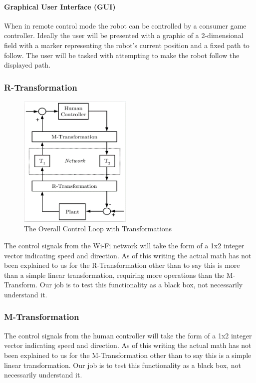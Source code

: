 \documentclass[english,12pt]{article}
\begin{document}
\paragraph{Graphical User Interface (GUI)}
When in remote control mode the robot can be controlled by a consumer game controller. Ideally the
user will be presented with a graphic of a 2-dimensional field with a marker representing the robot’s 
current position and a fixed path to follow. The user will be tasked with attempting to make the robot
follow the displayed path.
\subsubsection{R-Transformation}
\begin{figure}
    \vspace{-20pt}
    \begin{center}
      \includegraphics[width=0.48\textwidth]{ovr_tran.jpg}
    \end{center}
    \vspace{-20pt}
    \caption{The Overall Control Loop with Transformations}
    \vspace{-10pt}
  \end{figure}
The control signals from the Wi-Fi network will take the
form of a 1x2 integer vector indicating speed and
direction. As of this writing the actual math has not been
explained to us for the R-Transformation other than to
say this is more than a simple linear transformation,
requiring more operations than the M-Transform. Our job
is to test this functionality as a black box, not necessarily
understand it.
\subsubsection{M-Transformation}
The control signals from the human controller will take
the form of a 1x2 integer vector indicating speed and
direction. As of this writing the actual math has not been
explained to us for the M-Transformation other than to
say this is a simple linear transformation. Our job is to
test this functionality as a black box, not necessarily
understand it.
\end{document}
